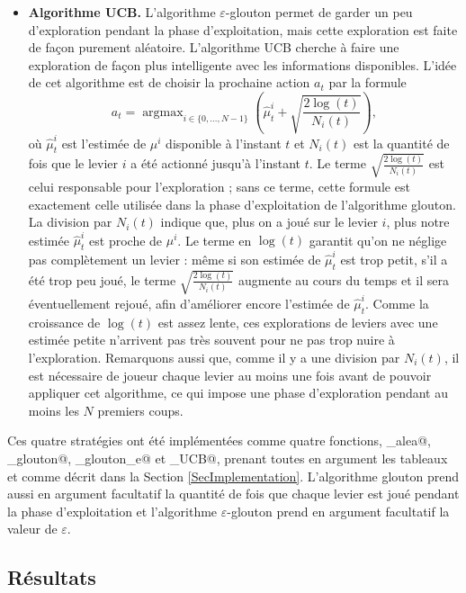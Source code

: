 \documentclass[a4paper,12pt]{article}
\DeclareMathOperator*{\argmax}{argmax}
\begin{document}
\begin{itemize}[label=\textbullet, leftmargin=*]
\item \textbf{Algorithme UCB.} L'algorithme $\varepsilon$-glouton permet de garder un peu d'exploration pendant la phase d'exploitation, mais cette exploration est faite de façon purement aléatoire. L'algorithme UCB cherche à faire une exploration de façon plus intelligente avec les informations disponibles. L'idée de cet algorithme est de choisir la prochaine action $a_t$ par la formule
\[a_t = \argmax_{i \in \{0, \dotsc, N-1\}} \left(\hat\mu_t^i + \sqrt{\frac{2 \log(t)}{N_i(t)}}\right),\]
où $\hat\mu_t^i$ est l'estimée de $\mu^i$ disponible à l'instant $t$ et $N_i(t)$ est la quantité de fois que le levier $i$ a été actionné jusqu'à l'instant $t$. Le terme $\sqrt{\frac{2 \log(t)}{N_i(t)}}$ est celui responsable pour l'exploration ; sans ce terme, cette formule est exactement celle utilisée dans la phase d'exploitation de l'algorithme glouton. La division par $N_i(t)$ indique que, plus on a joué sur le levier $i$, plus notre estimée $\hat\mu_t^i$ est proche de $\mu^i$. Le terme en $\log(t)$ garantit qu'on ne néglige pas complètement un levier : même si son estimée de $\hat\mu_t^i$ est trop petit, s'il a été trop peu joué, le terme $\sqrt{\frac{2 \log(t)}{N_i(t)}}$ augmente au cours du temps et il sera éventuellement rejoué, afin d'améliorer encore l'estimée de $\hat\mu_t^i$. Comme la croissance de $\log(t)$ est assez lente, ces explorations de leviers avec une estimée petite n'arrivent pas très souvent pour ne pas trop nuire à l'exploration. Remarquons aussi que, comme il y a une division par $N_i(t)$, il est nécessaire de joueur chaque levier au moins une fois avant de pouvoir appliquer cet algorithme, ce qui impose une phase d'exploration pendant au moins les $N$ premiers coups.
\end{itemize}

Ces quatre stratégies ont été implémentées comme quatre fonctions, \verb@algo_alea@, \verb@algo_glouton@, \verb@algo_glouton_e@ et \verb@algo_UCB@, prenant toutes en argument les tableaux \verb@mu@ et \verb@Na@ comme décrit dans la Section \ref{SecImplementation}. L'algorithme glouton prend aussi en argument facultatif la quantité de fois que chaque levier est joué pendant la phase d'exploitation et l'algorithme $\varepsilon$-glouton prend en argument facultatif la valeur de $\varepsilon$.

\subsection{Résultats}
\end{document}
